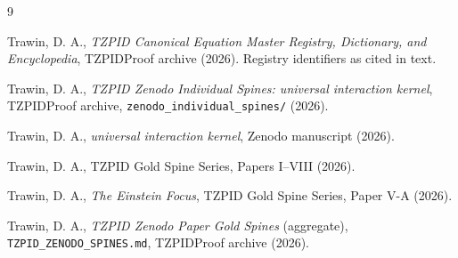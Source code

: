 \documentclass[11pt]{article}
\theoremstyle{remark}
\begin{document}
\begin{thebibliography}{9}

 Trawin, D. A., \emph{TZPID Canonical Equation Master Registry, Dictionary, and Encyclopedia}, TZPIDProof archive (2026). Registry identifiers as cited in text.

 Trawin, D. A., \emph{TZPID Zenodo Individual Spines: universal interaction kernel}, TZPIDProof archive, \texttt{zenodo\_individual\_spines/} (2026).

 Trawin, D. A., \emph{universal interaction kernel}, Zenodo manuscript (2026).

 Trawin, D. A., TZPID Gold Spine Series, Papers I--VIII (2026).

 Trawin, D. A., \emph{The Einstein Focus}, TZPID Gold Spine Series, Paper V-A (2026).

 Trawin, D. A., \emph{TZPID Zenodo Paper Gold Spines} (aggregate), \texttt{TZPID\_ZENODO\_SPINES.md}, TZPIDProof archive (2026).

\end{thebibliography}
\end{document}
